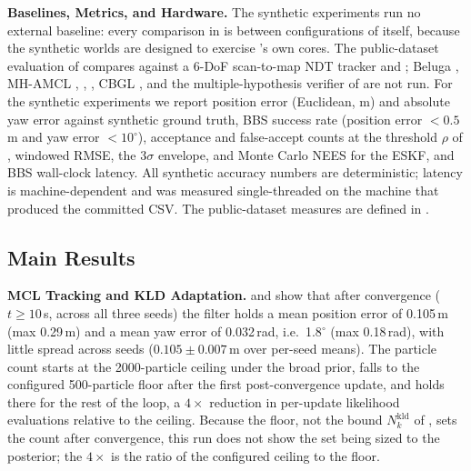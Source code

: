\noindent\textbf{Baselines, Metrics, and Hardware.} The synthetic experiments run no external baseline: every comparison in  is between configurations of \sname{} itself, because the synthetic worlds are designed to exercise \sname{}'s own cores. The public-dataset evaluation of  compares against a 6-DoF scan-to-map NDT tracker and ; Beluga \citep{puga2024beluga}, MH-AMCL \citep{garcia2023mhamcl},  \citep{koide2019portable},  \citep{koide2021hdlgl}, CBGL \citep{filotheou2024cbgl}, and the multiple-hypothesis verifier of \citet{gao2019global} are not run. For the synthetic experiments we report position error (Euclidean, m) and absolute yaw error against synthetic ground truth, BBS success rate (position error $<0.5$\,m and yaw error $<10^\circ$), acceptance and false-accept counts at the threshold $\rho$ of , windowed RMSE, the $3\sigma$ envelope, and Monte Carlo NEES for the ESKF, and BBS wall-clock latency. All synthetic accuracy numbers are deterministic; latency is machine-dependent and was measured single-threaded on the machine that produced the committed CSV. The public-dataset measures are defined in .

\subsection{Main Results}\label{sec:main}




\noindent\textbf{MCL Tracking and KLD Adaptation.}  and  show that after convergence ($t\ge10$\,s, across all three seeds) the  filter holds a mean position error of 0.105\,m (max 0.29\,m) and a mean yaw error of 0.032\,rad, i.e.\ 1.8$^\circ$ (max 0.18\,rad), with little spread across seeds ($0.105\pm0.007$\,m over per-seed means). The particle count starts at the 2000-particle ceiling under the broad prior, falls to the configured 500-particle floor after the first post-convergence update, and holds there for the rest of the loop, a $4\times$ reduction in per-update likelihood evaluations relative to the ceiling. Because the floor, not the bound $N^{\mathrm{kld}}_k$ of , sets the count after convergence, this run does not show the set being sized to the posterior; the $4\times$ is the ratio of the configured ceiling to the floor.

